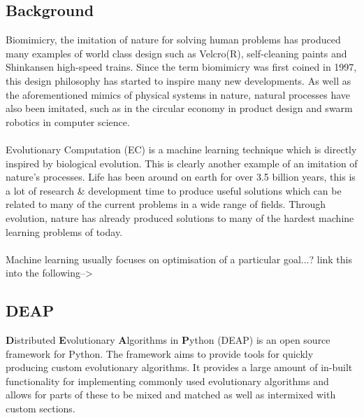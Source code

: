 \documentclass{article}
\begin{document}
\subsection{Background}
Biomimicry, the imitation of nature for solving human problems has produced many examples of world class design such as Velcro(R), self-cleaning paints and Shinkansen high-speed trains\cite{biomimicry}.  Since the term biomimicry was first coined in 1997, this design philosophy has started to inspire many new developments. As well as the aforementioned mimics of physical systems in nature, natural processes have also been imitated, such as in the circular economy in product design and swarm robotics in computer science.
\\\\
Evolutionary Computation (EC) is a machine learning technique which is directly inspired by biological evolution. This is clearly another example of an imitation of nature's processes.
Life has been around on earth for over 3.5 billion years, this is a lot of research \& development time to produce useful solutions which can be related to many of the current problems in a wide range of fields. Through evolution, nature has already produced solutions to many of the hardest machine learning problems of today.
\\\\
Machine learning usually focuses on optimisation of a particular goal...? link this into the following-->

\subsection{DEAP}
\textbf{D}istributed \textbf{E}volutionary \textbf{A}lgorithms in \textbf{P}ython (DEAP) is an open source framework for Python\cite{deap}. The framework aims to provide tools for quickly producing custom evolutionary algorithms. It provides a large amount of in-built functionality for implementing commonly used evolutionary algorithms and allows for parts of these to be mixed and matched as well as intermixed with custom sections. %
\end{document}
